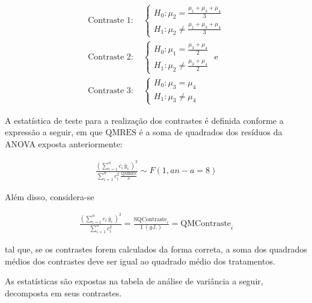 \documentclass[
]{article}
\begin{document}
\begin{align*}
  \text{Contraste 1: }&\begin{cases}
    H_0: \mu_2 = \frac{\mu_1+\mu_3+\mu_4}{3}\\
    H_1: \mu_2 \neq \frac{\mu_1+\mu_3+\mu_4}{3}
  \end{cases}\\
  \text{Contraste 2: }&\begin{cases}
    H_0: \mu_1 = \frac{\mu_3+\mu_4}{2}\\
    H_1: \mu_2 \neq \frac{\mu_3+\mu_4}{2}
  \end{cases} 
  \text{ e }\\
  \text{Contraste 3: }&\begin{cases}
    H_0: \mu_3 = \mu_4\\
    H_1: \mu_3 \neq \mu_4
  \end{cases}
\end{align*}

A estatística de teste para a realização dos contrastes é definida
conforme a expressão a seguir, em que \(\text{QMRES}\) é a soma de
quadrados dos resíduos da ANOVA exposta anteriormente:

\begin{align}
  \frac{\left( \sum\limits_{i = 1}^n c_i \, \bar{y}_{i.}\right)^2}{ \sum\limits_{i = 1}^n c_i^2 \, \frac{\text{QMRES}}{n}} \sim F(1, an-a = 8)
\end{align}

Além disso, considera-se

\begin{align}
  \frac{\left( \sum\limits_{i = 1}^n c_i \, \bar{y}_{i.}\right)^2}{\sum\limits_{i = 1}^n c_i^2} = \frac{\text{SQContraste}_i}{1 \, (g.l.)} = \text{QMContraste}_i
\end{align}

tal que, se os contrastes forem calculados da forma correta, a soma dos
quadrados médios dos contrastes deve ser igual ao quadrado médio dos
tratamentos.

As estatísticas são expostas na tabela de análise de variância a seguir,
decomposta em seus contrastes.
\end{document}
